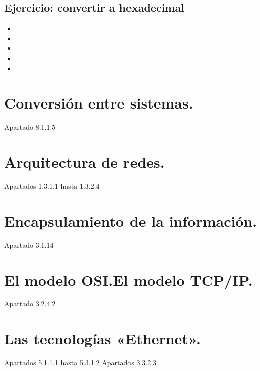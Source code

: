 \documentclass[letterpaper,10pt,spanish]{sphinxmanual}
\begin{document}
\subsection{Ejercicio: convertir a hexadecimal}
\label{\detokenize{t1_caracterizacion_redes/apuntes_t1:ejercicio-convertir-a-hexadecimal}}\begin{itemize}
\item {} 

\item {} 

\item {} 

\item {} 

\item {} 

\end{itemize}


\section{Conversión entre sistemas.}
\label{\detokenize{t1_caracterizacion_redes/apuntes_t1:conversion-entre-sistemas}}
\sphinxAtStartPar
Apartado 8.1.1.5


\section{Arquitectura de redes.}
\label{\detokenize{t1_caracterizacion_redes/apuntes_t1:arquitectura-de-redes}}
\sphinxAtStartPar
Apartados 1.3.1.1 hasta 1.3.2.4


\section{Encapsulamiento de la información.}
\label{\detokenize{t1_caracterizacion_redes/apuntes_t1:encapsulamiento-de-la-informacion}}
\sphinxAtStartPar
Apartado 3.1.14


\section{El modelo OSI.El modelo TCP/IP.}
\label{\detokenize{t1_caracterizacion_redes/apuntes_t1:el-modelo-osi-el-modelo-tcp-ip}}
\sphinxAtStartPar
Apartado 3.2.4.2


\section{Las tecnologías «Ethernet».}
\label{\detokenize{t1_caracterizacion_redes/apuntes_t1:las-tecnologias-ethernet}}
\sphinxAtStartPar
Apartados 5.1.1.1 hasta 5.3.1.2
Apartados 3.3.2.3
\end{document}
